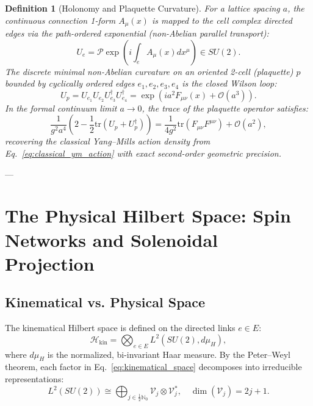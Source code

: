 \documentclass[11pt,reqno]{article}
\newtheorem{definition}[theorem]{Definition}
\begin{document}
\begin{definition}[Holonomy and Plaquette Curvature]
\label{def:holonomy_plaquette_curvature}
For a lattice spacing $a$, the continuous connection 1-form $A_\mu(x)$ is mapped to the cell complex directed edges via the path-ordered exponential (non-Abelian parallel transport):
\begin{equation}
    \label{eq:edge_holonomy_path_ordered}
    U_e = \mathcal{P} \exp\left( i \int_e A_\mu(x) dx^\mu \right) \in SU(2).
\end{equation}
The discrete minimal non-Abelian curvature on an oriented 2-cell (plaquette) $p$ bounded by cyclically ordered edges $e_1, e_2, e_3, e_4$ is the closed Wilson loop:
\begin{equation}
    \label{eq:plaquette_curvature_expansion}
    U_p = U_{e_1} U_{e_2} U_{e_3}^\dagger U_{e_4}^\dagger = \exp\left( i a^2 F_{\mu\nu}(x) + \mathcal{O}(a^3) \right).
\end{equation}
In the formal continuum limit $a \to 0$, the trace of the plaquette operator satisfies:
\begin{equation}
    \label{eq:plaquette_trace_continuum_limit}
    \frac{1}{g^2 a^4} \left( 2 - \frac{1}{2}\mathrm{tr}(U_p + U_p^\dagger) \right) = \frac{1}{4g^2} \mathrm{tr}\left( F_{\mu\nu} F^{\mu\nu} \right) + \mathcal{O}(a^2),
\end{equation}
recovering the classical Yang--Mills action density from Eq.~\eqref{eq:classical_ym_action} with exact second-order geometric precision.
\end{definition}

---

\section{The Physical Hilbert Space: Spin Networks and Solenoidal Projection}
\label{sec:hilbert_space}

\subsection{Kinematical vs. Physical Space}
The kinematical Hilbert space is defined on the directed links $e \in E$:
\begin{equation}
    \label{eq:kinematical_space}
    \mathcal{H}_{\mathrm{kin}} = \bigotimes_{e \in E} L^2(SU(2), d\mu_H),
\end{equation}
where $d\mu_H$ is the normalized, bi-invariant Haar measure. By the Peter--Weyl theorem, each factor in Eq.~\eqref{eq:kinematical_space} decomposes into irreducible representations:
\begin{equation}
    \label{eq:peter_weyl}
    L^2(SU(2)) \cong \bigoplus_{j \in \frac{1}{2}\mathbb{N}_0} \mathcal{V}_j \otimes \mathcal{V}_j^*, \quad \dim(\mathcal{V}_j) = 2j + 1.
\end{equation}
\end{document}
